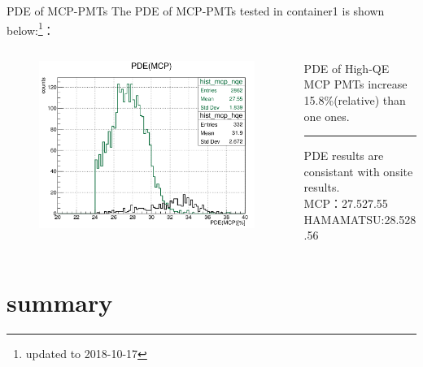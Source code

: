 \documentclass[11pt,compress,xcolor=x11names,UTF8]{beamer}
\begin{document}
\begin{frame}{PDE of MCP-PMTs}
The PDE of MCP-PMTs tested in container1 is shown below:\footnote{updated to 2018-10-17}：
\begin{columns}
\begin{column}{.56\textwidth}
\begin{figure}
\centering
\includegraphics[width=\textwidth]{mcppde}
\end{figure}
\end{column}
\begin{column}{.4\textwidth}
\alert{PDE of High-QE MCP PMTs increase 15.8\%(relative) than one ones.}
\vspace{.5cm}
\hrule{\textwidth}
\vspace{.5cm}
PDE results are consistant with onsite results.\\
MCP：27.5\leftrightarrow \alert{27.55}\\
HAMAMATSU:28.5\leftrightarrow \alert{28.56}
\end{column}
\end{columns}
\end{frame}
\section{summary}
\end{document}
